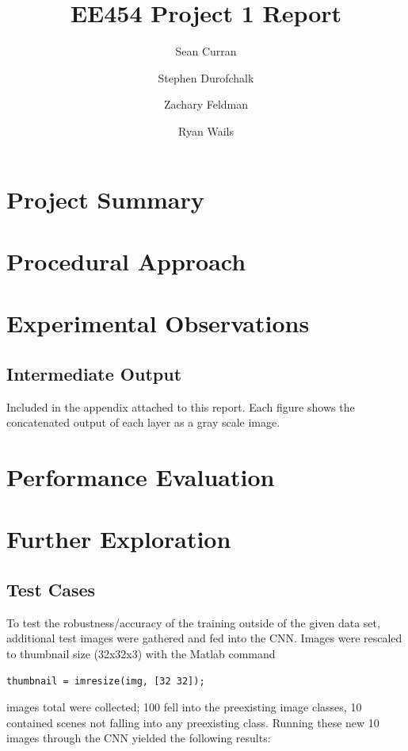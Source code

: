\documentclass[11pt,english]{article}
\author{Sean Curran \\
\and Stephen Durofchalk \\
\and Zachary Feldman \\
\and Ryan Wails}
\title{EE454 Project 1 Report}
\begin{document}
\maketitle

\newpage
\section{Project Summary}

\section{Procedural Approach}

\section{Experimental Observations}

\subsection{Intermediate Output}

Included in the appendix attached to this report.  Each figure shows the concatenated output of each layer as a gray scale image.

\section{Performance Evaluation}


\section{Further Exploration}
\subsection{Test Cases}
To test the robustness/accuracy of the training outside of the given data set, additional test images were gathered and fed into the CNN.  Images were rescaled to thumbnail size (32x32x3) with the Matlab command
\begin{lstlisting}
thumbnail = imresize(img, [32 32]);
\end{lstlisting}

 images total were collected; 100 fell into the preexisting image classes, 10 contained scenes not falling into any preexisting class.  Running these new 10 images through the CNN yielded the following results:\\
\end{document}
